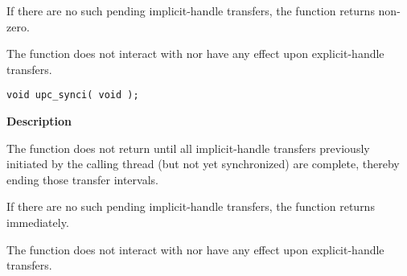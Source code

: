 \np If there are no such pending implicit-handle transfers, the function returns non-zero.

\np The \func function does not interact with nor have any effect upon explicit-handle transfers.

\def\bfunc{upc\_synci}
\funcheader

\begin{verbatim}
void upc_synci( void );
\end{verbatim}

{\bf Description}

\np The \func function does not return until all implicit-handle transfers
previously initiated by the calling thread (but not yet synchronized) are complete, 
thereby ending those transfer intervals.

\np If there are no such pending implicit-handle transfers, the function returns immediately.

\np The \func function does not interact with nor have any effect upon explicit-handle transfers.

